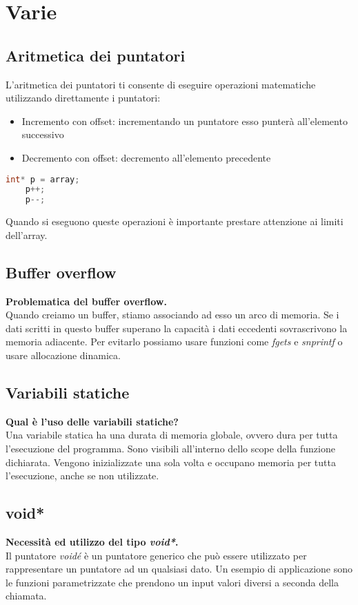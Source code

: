 \newpage
\section{Varie}
\subsection{Aritmetica dei puntatori}
L'aritmetica dei puntatori ti consente di eseguire operazioni matematiche utilizzando direttamente i puntatori:
\begin{itemize}
	\item Incremento con offset: incrementando un puntatore esso punterà all'elemento successivo
	\item Decremento con offset: decremento all'elemento precedente
\end{itemize}
\begin{lstlisting}[language=C]
	int* p = array;
	p++;
	p--;
\end{lstlisting}
\begin{note}
	Quando si eseguono queste operazioni è importante prestare attenzione ai limiti dell'array.
\end{note}
\subsection{Buffer overflow}
\textbf{Problematica del buffer overflow.}\\
Quando creiamo un buffer, stiamo associando ad esso un arco di memoria. Se i dati scritti in questo buffer superano la capacità i dati eccedenti sovrascrivono la memoria adiacente. Per evitarlo possiamo usare funzioni come \textit{fgets} e \textit{snprintf} o usare allocazione dinamica.

\subsection{Variabili statiche}
\textbf{Qual è l'uso delle variabili statiche?}\\
Una variabile statica ha una durata di memoria globale, ovvero dura per tutta l'esecuzione del programma. Sono visibili all'interno dello scope della funzione dichiarata. Vengono inizializzate una sola volta e occupano memoria per tutta l'esecuzione, anche se non utilizzate.

\subsection{void*}
\textbf{Necessità ed utilizzo del tipo \textit{void*}.}\\
Il puntatore \textit{voidé} è un puntatore generico che  può essere utilizzato per rappresentare un puntatore ad un qualsiasi dato. Un esempio di applicazione sono le funzioni parametrizzate che prendono un input valori diversi a seconda della chiamata.

